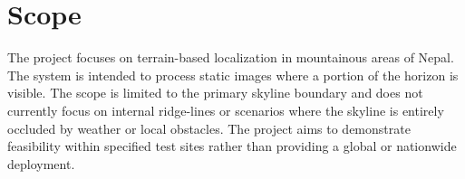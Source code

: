 \section{Scope}
The project focuses on terrain-based localization in mountainous areas of Nepal. The system is intended to process static images where a portion of the horizon is visible. The scope is limited to the primary skyline boundary and does not currently focus on internal ridge-lines or scenarios where the skyline is entirely occluded by weather or local obstacles. The project aims to demonstrate feasibility within specified test sites rather than providing a global or nationwide deployment.
